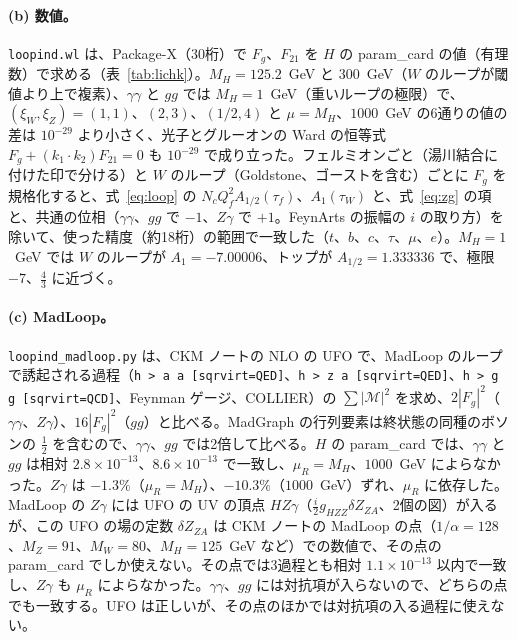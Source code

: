 \documentclass[a4paper,10pt]{ltjsarticle}
\begin{document}
\paragraph{(b) 数値。}\texttt{loopind.wl} は、Package-X（30桁）で $F_g$、$F_{21}$ を $H$ の param\_card の値（有理数）で求める（表~\ref{tab:lichk}）。$M_H=125.2$~GeV と $300$~GeV（$W$ のループが閾値より上で複素）、$\gamma\gamma$ と $gg$ では $M_H=1$~GeV（重いループの極限）で、$(\xi_W,\xi_Z)=(1,1)$、$(2,3)$、$(1/2,4)$ と $\mu=M_H$、$1000$~GeV の6通りの値の差は $10^{-29}$ より小さく、光子とグルーオンの Ward の恒等式 $F_g+(k_1\cdot k_2)F_{21}=0$ も $10^{-29}$ で成り立った。フェルミオンごと（湯川結合に付けた印で分ける）と $W$ のループ（Goldstone、ゴーストを含む）ごとに $F_g$ を規格化すると、式~\eqref{eq:loop} の $N_cQ_f^2A_{1/2}(\tau_f)$、$A_1(\tau_W)$ と、式~\eqref{eq:zg} の項と、共通の位相（$\gamma\gamma$、$gg$ で $-1$、$Z\gamma$ で $+1$。FeynArts の振幅の $i$ の取り方）を除いて、使った精度（約18桁）の範囲で一致した（$t$、$b$、$c$、$\tau$、$\mu$、$e$）。$M_H=1$~GeV では $W$ のループが $A_1=-7.00006$、トップが $A_{1/2}=1.333336$ で、極限 $-7$、$\frac43$ に近づく。

\paragraph{(c) MadLoop。}\texttt{loopind\_madloop.py} は、CKM ノートの NLO の UFO で、MadLoop のループで誘起される過程（\texttt{h > a a [sqrvirt=QED]}、\texttt{h > z a [sqrvirt=QED]}、\texttt{h > g g [sqrvirt=QCD]}、Feynman ゲージ、COLLIER）の $\sum|\mathcal M|^2$ を求め、$2|F_g|^2$（$\gamma\gamma$、$Z\gamma$）、$16|F_g|^2$（$gg$）と比べる。MadGraph の行列要素は終状態の同種のボソンの $\frac12$ を含むので、$\gamma\gamma$、$gg$ では2倍して比べる。$H$ の param\_card では、$\gamma\gamma$ と $gg$ は相対 $2.8\times10^{-13}$、$8.6\times10^{-13}$ で一致し、$\mu_R=M_H$、$1000$~GeV によらなかった。$Z\gamma$ は $-1.3\%$（$\mu_R=M_H$）、$-10.3\%$（$1000$~GeV）ずれ、$\mu_R$ に依存した。MadLoop の $Z\gamma$ には UFO の UV の頂点 $HZ\gamma$（$\frac i2g_{HZZ}\delta Z_{ZA}$、2個の図）が入るが、この UFO の場の定数 $\delta Z_{ZA}$ は CKM ノートの MadLoop の点（$1/\alpha=128$、$M_Z=91$、$M_W=80$、$M_H=125$~GeV など）での数値で、その点の param\_card でしか使えない。その点では3過程とも相対 $1.1\times10^{-13}$ 以内で一致し、$Z\gamma$ も $\mu_R$ によらなかった。$\gamma\gamma$、$gg$ には対抗項が入らないので、どちらの点でも一致する。UFO は正しいが、その点のほかでは対抗項の入る過程に使えない。
\end{document}
